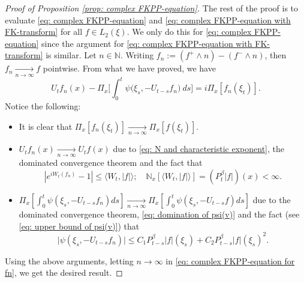 \begin{proof}[Proof of Proposition \ref{prop: complex FKPP-equation}]
    The rest of the proof is to evaluate \eqref{eq: complex FKPP-equation} and \eqref{eq: complex FKPP-equation with FK-transform} for all $f\in L_2(\xi)$. We only do this for \eqref{eq: complex FKPP-equation} since the argument for \eqref{eq: complex FKPP-equation with FK-transform} is similar.
    Let $n \in \mathbb N$.
    Writing $f_n := (f^+ \wedge n) - (f^- \wedge n)$, then $f_n \xrightarrow[n\to \infty]{} f$ pointwise.
    From what we have proved, we have
\begin{equation}
\label{eq: complex FKPP-equation for fn}
    U_tf_n(x) - \Pi_{x} \Big[\int_0^t \psi\big(\xi_s, - U_{t-s}f_n\big) ~ds\Big]
    = i \Pi_{x} [f_n(\xi_t)].
\end{equation}
    Notice the following:
\begin{itemize}
\item
    It is clear that $\Pi_{x}[f_n(\xi_t)] \xrightarrow[n\to \infty]{} \Pi_{x}[f(\xi_t)]$.
\item
    $U_tf_n(x) \xrightarrow[n\to \infty]{} U_tf(x)$ due to \eqref{eq: N and characteristic exponent}, the dominated convergence theorem and the fact that
\[
    |e^{i W_t(f_n)} - 1| \leq \langle W_t, |f|\rangle;
    \quad \mathbb N_x[\langle W_t, |f|\rangle] = (P_t^{\beta} |f|)(x) < \infty.
\]
\item
    $\Pi_{x} [\int_0^t \psi(\xi_s,- U_{t-s}f_n)ds] \xrightarrow[n\to \infty]{} \Pi_{x} [\int_0^t \psi(\xi_s,- U_{t-s}f)ds]$ due to the dominated convergence theorem, \eqref{eq: domination of psi(v)} and the fact (see \eqref{eq: upper bound of psi(v)}) that
\begin{equation}
    \big|\psi(\xi_s,- U_{t-s}f_n)\big|
    \leq C_1 P_{t-s}^{\beta}|f|(\xi_s)+C_2 P_{t-s}^{\beta}|f|(\xi_s)^2.
\end{equation}
\end{itemize}
    Using the above arguments, letting $n \to \infty$ in \eqref{eq: complex FKPP-equation for fn}, we get the desired result.
\end{proof}

